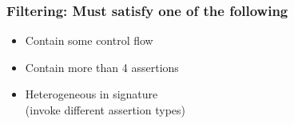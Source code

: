 \documentclass{beamer}
\begin{document}

\begin{frame}
\frametitle{Filtering: Must satisfy one of the following} {
   \Large
   \begin{itemize}
      \item Contain some control flow
         \vspace{0.5cm}
      \item Contain more than 4 assertions
         \vspace{0.5cm}
      \item Heterogeneous in signature \\(invoke different assertion types)
   \end{itemize}
   }
\end{frame}
\end{document}
